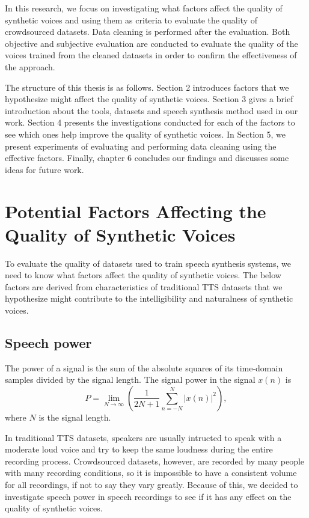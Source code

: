 \documentclass[12pt]{article}
\begin{document}
In this research, we focus on investigating what factors affect the quality of synthetic voices and using them as criteria to evaluate the quality of crowdsourced datasets. Data cleaning is performed after the evaluation. Both objective and subjective evaluation are conducted to evaluate the quality of the voices trained from the cleaned datasets in order to confirm the effectiveness of the approach.

The structure of this thesis is as follows. Section 2 introduces factors that we hypothesize might affect the quality of synthetic voices. Section 3 gives a brief introduction about the tools, datasets and speech synthesis method used in our work. Section 4 presents the investigations conducted for each of the factors to see which ones help improve the quality of synthetic voices. In Section 5, we present experiments of evaluating and performing data cleaning using the effective factors. Finally, chapter 6 concludes our findings and discusses some ideas for future work.
 

\clearpage
\section{Potential Factors Affecting the Quality of Synthetic Voices}\label{sec_potentialFactors}
To evaluate the quality of datasets used to train speech synthesis systems, we need to know what factors affect the quality of synthetic voices. The below factors are derived from characteristics of traditional TTS datasets that we hypothesize might contribute to the intelligibility and naturalness of synthetic voices.

\subsection{Speech power}\label{subsec_speechPower}
The power of a signal is the sum of the absolute squares of its time-domain samples divided by the signal length. The signal power in the signal $x(n)$ is
\begin{equation}\label{exp_power}
    P = \lim_{N\to\infty} (\frac{1}{2N+1}\sum_{n=-N}^{N} |x(n)|^2),
\end{equation}
where $N$ is the signal length.

In traditional TTS datasets, speakers are usually intructed to speak with a moderate loud voice and try to keep the same loudness during the entire recording process. Crowdsourced datasets, however, are recorded by many people with many recording conditions, so it is impossible to have a consistent volume for all recordings, if not to say they vary greatly. Because of this, we decided to investigate speech power in speech recordings to see if it has any effect on the quality of synthetic voices.
\end{document}
